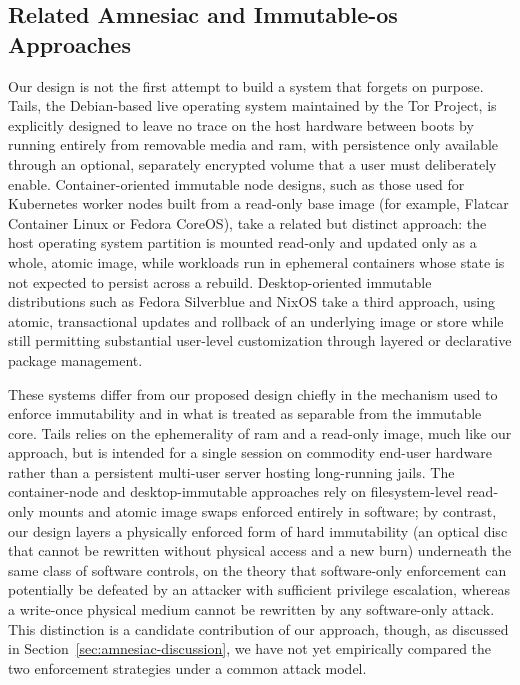 \subsection{Related Amnesiac and Immutable-\gls{os} Approaches}
Our design is not the first attempt to build a system that forgets on purpose.  Tails, the Debian-based live \gls{operating system} maintained by the Tor Project, is explicitly designed to leave no trace on the host hardware between boots by running entirely from removable media and \gls{ram}, with persistence only available through an optional, separately encrypted volume that a user must deliberately enable.  Container-oriented immutable node designs, such as those used for Kubernetes worker nodes built from a read-only base image (for example, Flatcar Container Linux or Fedora CoreOS), take a related but distinct approach: the host \gls{operating system} partition is mounted read-only and updated only as a whole, atomic image, while workloads run in ephemeral containers whose state is not expected to persist across a rebuild.  Desktop-oriented immutable distributions such as Fedora Silverblue and NixOS take a third approach, using atomic, transactional updates and rollback of an underlying image or store while still permitting substantial user-level customization through layered or declarative package management.

These systems differ from our proposed design chiefly in the mechanism used to enforce immutability and in what is treated as separable from the immutable core.  Tails relies on the ephemerality of \gls{ram} and a read-only image, much like our approach, but is intended for a single session on commodity end-user hardware rather than a persistent multi-user server hosting long-running \glspl{jail}.  The container-node and desktop-immutable approaches rely on filesystem-level read-only mounts and atomic image swaps enforced entirely in software; by contrast, our design layers a physically enforced form of \gls{hard immutability} (an optical disc that cannot be rewritten without physical access and a new burn) underneath the same class of software controls, on the theory that software-only enforcement can potentially be defeated by an attacker with sufficient privilege escalation, whereas a write-once physical medium cannot be rewritten by any software-only \gls{attack}.  This distinction is a candidate contribution of our approach, though, as discussed in Section~\ref{sec:amnesiac-discussion}, we have not yet empirically compared the two enforcement strategies under a common \gls{attack} model.

